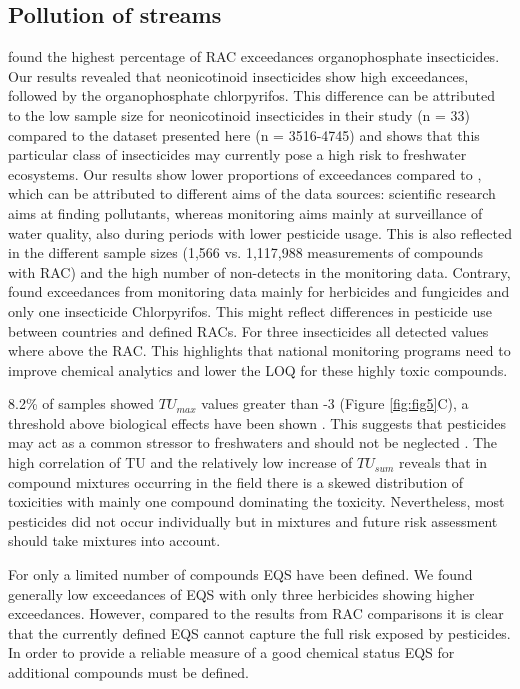 \documentclass[journal=esthag,manuscript=article]{achemso}
\begin{document}
\subsection{Pollution of streams}
\citet{stehle_pesticide_2015} found the highest percentage of RAC exceedances organophosphate insecticides. 
Our results revealed that neonicotinoid insecticides show high exceedances, followed by the organophosphate chlorpyrifos. 
This difference can be attributed to the low sample size for neonicotinoid insecticides in their study (n = 33) compared to the dataset presented here (n = 3516-4745) and shows that this particular class of insecticides may currently pose a high risk to freshwater ecosystems.
Our results show lower proportions of exceedances compared to \citet{stehle_pesticide_2015}, which can be attributed to different aims of the data sources: scientific research aims at finding pollutants, whereas monitoring aims mainly at surveillance of water quality, also during periods with lower pesticide usage. 
This is also reflected in the different sample sizes (1,566 vs. 1,117,988 measurements of compounds with RAC) and the high number of non-detects in the monitoring data.
Contrary, \citet{knauer_pesticides_2016} found exceedances from monitoring data mainly for herbicides and fungicides and only one insecticide Chlorpyrifos.
This might reflect differences in pesticide use between countries and defined RACs.
For three insecticides all detected values where above the RAC.
This highlights that national monitoring programs need to improve chemical analytics and lower the LOQ for these highly toxic compounds.

8.2\% of samples showed $TU_{max}$ values greater than -3 (Figure \ref{fig:fig5}C), a threshold above biological effects have been shown \citep{schafer_thresholds_2012}.
This suggests that pesticides may act as a common stressor to freshwaters and should not be neglected \citep{schafer_contribution_2016}.
The high correlation of TU and the relatively low increase of $TU_{sum}$ reveals that in compound mixtures occurring in the field there is a skewed distribution of toxicities with mainly one compound dominating the toxicity.
Nevertheless, most pesticides did not occur individually but in mixtures \cite{schreiner_pesticide_2016} and future risk assessment should take mixtures into account.

For only a limited number of compounds EQS have been defined. 
We found generally low exceedances of EQS with only three herbicides showing higher exceedances.
However, compared to the results from RAC comparisons it is clear that the currently defined EQS cannot capture the full risk exposed by pesticides.
In order to provide a reliable measure of a good chemical status EQS for additional compounds must be defined.
\end{document}
